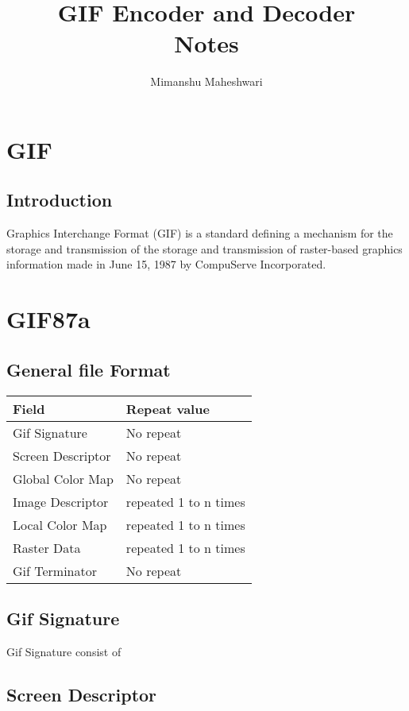\documentclass{report}
\title{GIF Encoder and Decoder \\ \large{Notes}}
\author{Mimanshu Maheshwari}
\begin{document}
\maketitle

\tableofcontents

\chapter{GIF}
\section{Introduction}
Graphics Interchange Format (GIF) is a standard defining a mechanism for the storage and transmission of the storage and transmission of raster-based graphics information made in June 15, 1987 by CompuServe Incorporated. 

\chapter{GIF87a}

\section{General file Format}

\begin{table}[h]
	\begin{tabular}{|l|l|}
		\hline
		\textbf{Field} & \textbf{Repeat value} \\\hline 
		Gif Signature & No repeat \\ \hline
		Screen Descriptor & No repeat  \\ \hline
		Global Color Map &  No repeat \\ \hline
		Image Descriptor & repeated 1 to n times \\ \hline
		Local Color Map  & repeated 1 to n times \\ \hline
		Raster Data  & repeated 1 to n times \\ \hline
		Gif Terminator &  No repeat \\ \hline
	\end{tabular}
\end{table}

\section{Gif Signature}
Gif Signature consist of 
\section{Screen Descriptor}
\end{document}
